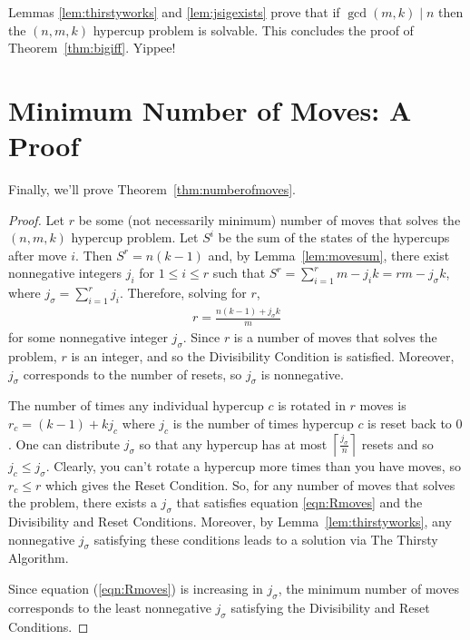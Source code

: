 \documentclass{article}
\theoremstyle{theorem}
\theoremstyle{definition}
\begin{document}
Lemmas \ref{lem:thirstyworks} and \ref{lem:jsigexists} prove that if $\gcd(m,k)\mid n$ then the $(n,m,k)$ hypercup problem is solvable.  This concludes the proof of Theorem~\ref{thm:bigiff}. Yippee!

\section*{Minimum Number of Moves: A Proof}

Finally, we'll prove Theorem~\ref{thm:numberofmoves}.

\begin{proof}
    Let $r$ be some (not necessarily minimum) number of moves that solves the $(n,m,k)$ hypercup problem. Let $S^i$ be the sum of the states of the hypercups after move $i$. Then $S^r = n(k-1)$ and, by Lemma~\ref{lem:movesum}, there exist nonnegative integers $j_i$ for $1\le i\le r$ such that $S^r = \sum_{i=1}^r m - j_i k =rm - j_\sigma k$, where $j_\sigma = \sum_{i=1}^r j_i$. Therefore, solving for $r$,
        \begin{align}
            r = \frac{n(k-1)+j_\sigma k}{m} \label{eqn:Rmoves}
        \end{align}
    for some nonnegative integer $j_\sigma$. Since $r$ is a number of moves that solves the problem, $r$ is an integer, and so the Divisibility Condition is satisfied. Moreover, $j_\sigma$ corresponds to the number of resets, so $j_\sigma$ is nonnegative. 
    
    The number of times any individual hypercup $c$ is rotated in $r$ moves is $r_c = (k-1) + k j_c$ where $j_c$ is the number of times hypercup $c$ is reset back to $0$.  One can distribute $j_\sigma$ so that any hypercup has at most $\left\lceil \frac{j_\sigma}{n}\right\rceil$ resets and so $j_c\le j_\sigma$. Clearly, you can't rotate a hypercup more times than you have moves, so $r_c \le r$ which gives the Reset Condition. 
    So, for any number of moves that solves the problem, there exists a $j_\sigma$ that satisfies equation \ref{eqn:Rmoves} and the Divisibility and Reset Conditions. Moreover, by Lemma~\ref{lem:thirstyworks}, any nonnegative $j_\sigma$ satisfying these conditions leads to a solution via The Thirsty Algorithm. 
    
    Since equation (\ref{eqn:Rmoves}) is increasing in $j_\sigma$, the minimum number of moves corresponds to the least nonnegative $j_\sigma$ satisfying the Divisibility and Reset Conditions.
\end{proof}
\end{document}
